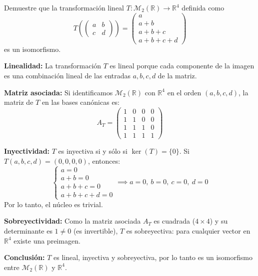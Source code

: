 \begin{prob}
Demuestre que la transformación lineal $T:\mathcal{M}_{2}\left(\mathbb{R}\right) \rightarrow \mathbb{R}^{4}$
definida como
\[
T\left(
\begin{pmatrix}
a & b \\
c & d
\end{pmatrix}
\right) = 
\begin{pmatrix}
a \\
a+b \\
a+b+c \\
a+b+c+d
\end{pmatrix}
\]
es un isomorfismo.
\begin{myproof}
\textbf{Linealidad:}  
La transformación $T$ es lineal porque cada componente de la imagen es una combinación lineal de las entradas $a, b, c, d$ de la matriz.

\textbf{Matriz asociada:}  
Si identificamos $\mathcal{M}_2(\mathbb{R})$ con $\mathbb{R}^4$ en el orden $(a, b, c, d)$, la matriz de $T$ en las bases canónicas es:
\[
A_T = 
\begin{pmatrix}
1 & 0 & 0 & 0 \\
1 & 1 & 0 & 0 \\
1 & 1 & 1 & 0 \\
1 & 1 & 1 & 1
\end{pmatrix}
\]

\textbf{Inyectividad:}  
$T$ es inyectiva si y sólo si $\ker(T) = \{0\}$. Si $T(a, b, c, d) = (0, 0, 0, 0)$, entonces:
\[
\begin{cases}
a = 0 \\
a + b = 0 \\
a + b + c = 0 \\
a + b + c + d = 0
\end{cases}
\implies
a = 0,\ b = 0,\ c = 0,\ d = 0
\]
Por lo tanto, el núcleo es trivial.

\textbf{Sobreyectividad:}  
Como la matriz asociada $A_T$ es cuadrada ($4 \times 4$) y su determinante es $1 \neq 0$ (es invertible), $T$ es sobreyectiva: para cualquier vector en $\mathbb{R}^4$ existe una preimagen.

\textbf{Conclusión:}  
$T$ es lineal, inyectiva y sobreyectiva, por lo tanto es un isomorfismo entre $\mathcal{M}_2(\mathbb{R})$ y $\mathbb{R}^4$.
\end{myproof}
\end{prob}


